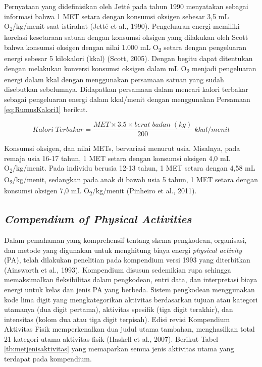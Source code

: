 Pernyataan yang didefinisikan oleh Jetté pada tahun 1990 menyatakan sebagai informasi bahwa 1 MET setara dengan konsumsi oksigen sebesar 3,5 mL O\textsubscript{2}/kg/menit saat istirahat (Jetté et al., 1990). Pengeluaran energi memiliki korelasi kesetaraan satuan dengan konsumsi oksigen yang dilakukan oleh Scott bahwa konsumsi oksigen dengan nilai 1.000 mL O\textsubscript{2} setara dengan pengeluaran energi sebesar 5 kilokalori (kkal) (Scott, 2005). Dengan begitu dapat ditentukan dengan melakukan konversi konsumsi oksigen dalam mL O\textsubscript{2} menjadi pengeluaran energi dalam kkal dengan menggunakan persamaan satuan yang sudah disebutkan sebelumnya. Didapatkan persamaan dalam mencari kalori terbakar sebagai pengeluaran energi dalam kkal/menit dengan menggunakan Persamaan \ref{eq:RumusKalori1} berikut.

\begin{equation}
  \label{eq:RumusKalori1}
  Kalori \; Terbakar = \frac{MET \times 3.5 \times berat \; badan \; (kg)}{200} \; kkal/menit
\end{equation}

Konsumsi oksigen, dan nilai METs, bervariasi menurut usia. Misalnya, pada remaja usia 16-17 tahun, 1 MET setara dengan konsumsi oksigen 4,0 mL O\textsubscript{2}/kg/menit. Pada individu berusia 12-13 tahun, 1 MET setara dengan 4,58 mL O\textsubscript{2}/kg/menit, sedangkan pada anak di bawah usia 5 tahun, 1 MET setara dengan konsumsi oksigen 7,0 mL O\textsubscript{2}/kg/menit (Pinheiro et al., 2011).

\subsection{\emph{Compendium of Physical Activities}}
\label{subsec:compendium}

Dalam pemahaman yang komprehensif tentang skema pengkodean, organisasi, dan metode yang digunakan untuk menghitung biaya energi \emph{physical activity} (PA), telah dilakukan penelitian pada kompendium versi 1993 yang diterbitkan (Ainsworth et al., 1993). Kompendium disusun sedemikian rupa sehingga memaksimalkan fleksibilitas dalam pengkodean, entri data, dan interpretasi biaya energi untuk kelas dan jenis PA yang berbeda. Sistem pengkodean menggunakan kode lima digit yang mengkategorikan aktivitas berdasarkan tujuan atau kategori utamanya (dua digit pertama), aktivitas spesifik (tiga digit terakhir), dan intensitas (kolom dua atau tiga digit terpisah). Edisi revisi Kompendium Aktivitas Fisik memperkenalkan dua judul utama tambahan, menghasilkan total 21 kategori utama aktivitas fisik (Haskell et al., 2007). Berikut Tabel \ref{tb:metjenisaktivitas} yang memaparkan semua jenis aktivitas utama yang terdapat pada kompendium.

